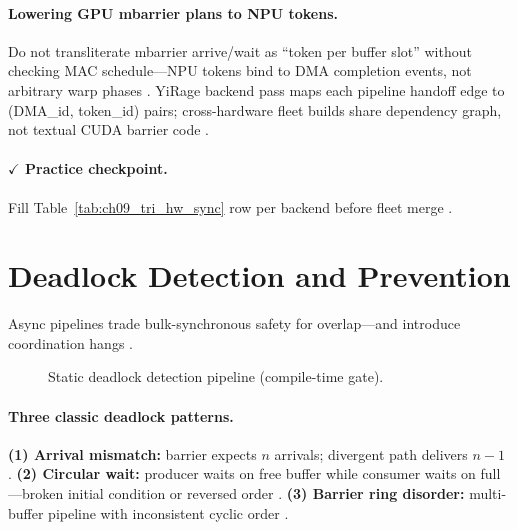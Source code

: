 \paragraph{Lowering GPU mbarrier plans to NPU tokens.}
Do not transliterate mbarrier arrive/wait as ``token per buffer slot'' without checking MAC schedule---NPU tokens bind to DMA completion events, not arbitrary warp phases \citep{amd2024xdna,yirage2026,patel2025llminference}.
YiRage backend pass maps each pipeline handoff edge to (DMA\_id, token\_id) pairs; cross-hardware fleet builds share dependency graph, not textual CUDA barrier code \citep{chen2020compilerbasedhardw,mpk2025}.

\paragraph{$\checkmark$ Practice checkpoint.}
Fill Table~\ref{tab:ch09_tri_hw_sync} row per backend before fleet merge \citep{yirage2026,patel2025llminference,chen2020compilerbasedhardw}.

\section{Deadlock Detection and Prevention}
\label{sec:ch09_deadlock_detection}

Async pipelines trade bulk-synchronous safety for overlap---and introduce coordination hangs \citep{shah2024flashattention3,nvidia2022hopper,yirage2026}.

\begin{figure}[t]
\centering
{}
\caption{Static deadlock detection pipeline (compile-time gate).}
\label{fig:ch09_deadlock_flow}
\end{figure}

\paragraph{Three classic deadlock patterns.}
\textbf{(1) Arrival mismatch:} barrier expects $n$ arrivals; divergent path delivers $n{-}1$ \citep{shah2024flashattention3,nvidia2022hopper}.
\textbf{(2) Circular wait:} producer waits on free buffer while consumer waits on full---broken initial condition or reversed order \citep{semianalysis2024tma,dao2022flashattention}.
\textbf{(3) Barrier ring disorder:} multi-buffer pipeline with inconsistent cyclic order \citep{shah2024flashattention3,yirage2026}.

